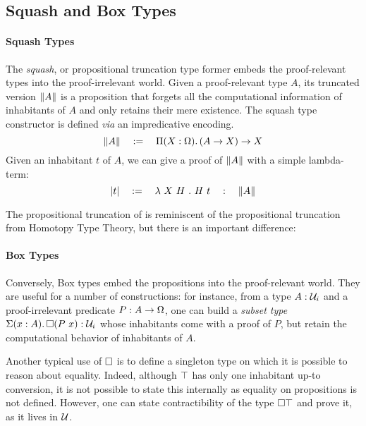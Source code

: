 \subsection{Squash and Box Types}

\paragraph*{Squash Types}

The \emph{squash}, or propositional truncation type former embeds the 
proof-relevant types into the proof-irrelevant world.
% 
Given a proof-relevant type \( A \), its truncated version \( \Squash{A} \) is a
proposition that forgets all the computational information of inhabitants of
\( A \) and only retains their mere existence.
% 
The squash type constructor is defined \textit{via} an impredicative encoding.
\[
	\Squash{A} \quad := \quad \Depfun[X]{\sProp}{\Fun{(\Fun{A}{X})}{X}}
\]
Given an inhabitant \( t \) of \( A \), we can give a proof of \( \Squash{A} \)
with a simple lambda-term: 
\[
	\squash{t} \quad := \quad \lambda\ X\ H\ .\ H\ t \quad : \quad \Squash{A}
\]

The propositional truncation of \SetoidCC is reminiscent of the
propositional truncation from Homotopy Type Theory, but there is an important 
difference:
% 

\paragraph*{Box Types}
% 
Conversely, Box types embed the propositions into the proof-relevant world.
They are useful for a number of constructions: for instance, from a type \( \tm{A}{\Type_i} \) and a
proof-irrelevant predicate \( \tm{P}{\Fun{A}{\sProp}} \), one can build a \emph{subset type}
\( \tm{\Sig{A}{\Boxt{(P\ x)}}}{\Type_i} \) whose inhabitants come with a proof of \( P \), but
retain the computational behavior of inhabitants of \( A \).

Another typical use of $\Boxt{}$ is to define a singleton
  type on which it is possible to reason about equality. Indeed, although
  $\Unit$ has only one inhabitant up-to conversion, it is not possible
  to state this internally as equality on propositions is not defined.
  However, one can state contractibility of the type $\Boxt{\Unit}$ and prove
  it, as it lives in $\Type$.

